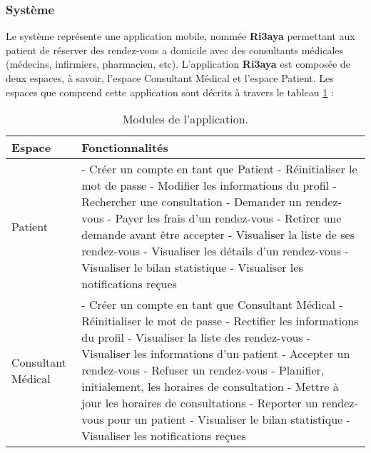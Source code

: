 \subsubsection{Système}
\label{4.1.1.1}
Le système représente une application mobile, nommée \textbf{Ri3aya} permettant aux patient de réserver des rendez-vous a domicile avec des consultants médicales (médecins, infirmiers, pharmacien, etc). \newline
L’application \textbf{Ri3aya} est composée de deux espaces, à savoir, l’espace Consultant Médical et l’espace Patient.
Les espaces que comprend cette application sont décrits à travers le tableau \ref{4.1} :
\begin{table}[h]
	\begin{tabular}{|m{6cm}|m{10cm}|}
		\hline
		\textbf{Espace} & \textbf{Fonctionnalités} \\
		\hline
		Patient & -	Créer un compte en tant que Patient \newline
		- Réinitialiser le mot de passe \newline
		- Modifier les informations du profil \newline
		- Rechercher une consultation \newline
		- Demander un rendez-vous \newline
		- Payer les frais d’un rendez-vous \newline
		- Retirer une demande avant être accepter \newline
		- Visualiser la liste de ses rendez-vous \newline
		- Visualiser les détails d’un rendez-vous \newline
		- Visualiser le bilan statistique \newline
		- Visualiser les notifications reçues \\
		\hline
		Consultant Médical & - Créer un compte en tant que Consultant Médical \newline
		- Réinitialiser le mot de passe \newline
		- Rectifier les informations du profil \newline
		- Visualiser la liste des rendez-vous \newline
		- Visualiser les informations d’un patient \newline
		- Accepter un rendez-vous \newline
		- Refuser un rendez-vous \newline
		- Planifier, initialement, les horaires de consultation \newline
		- Mettre à jour les horaires de consultations \newline
		- Reporter un rendez-vous pour un patient \newline
		- Visualiser le bilan statistique \newline
		- Visualiser les notifications reçues \\
		\hline
	\end{tabular}
	\caption{Modules de l’application.}
	\label{4.1}
\end{table}

